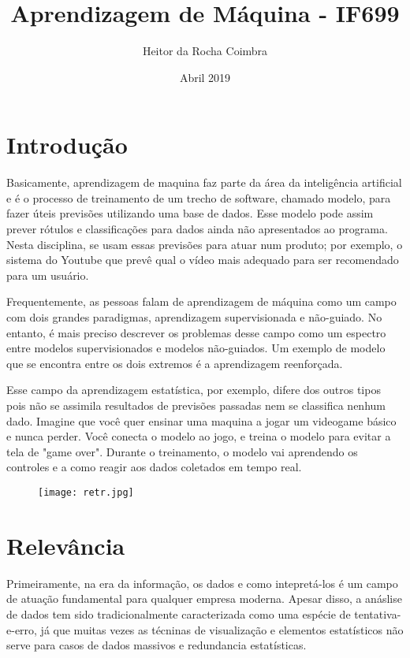 \documentclass[10pt]{article}
\title{Aprendizagem de Máquina - IF699}
\author{Heitor da Rocha Coimbra}
\date{Abril 2019}
\begin{document}
\maketitle

\section{Introdução}
Basicamente, aprendizagem de maquina faz parte da área da inteligência artificial e é o processo de treinamento de um trecho de software, chamado modelo, para fazer úteis previsões utilizando uma base de dados. Esse modelo pode assim prever rótulos e classificações para dados ainda não apresentados ao programa. Nesta disciplina, se usam essas previsões para atuar num produto; por exemplo, o sistema do Youtube que prevê qual o vídeo mais adequado para ser recomendado para um usuário.\newline


Frequentemente, as pessoas falam de aprendizagem de máquina como um campo com dois grandes paradigmas, aprendizagem supervisionada e não-guiado. No entanto, é mais preciso descrever os problemas desse campo como um espectro entre modelos supervisionados e modelos não-guiados. Um exemplo de modelo que se encontra entre os dois extremos é a aprendizagem reenforçada.\newline


Esse campo da aprendizagem estatística, por exemplo, difere dos outros tipos pois não se assimila resultados de previsões passadas nem se classifica nenhum dado. Imagine que você quer ensinar uma maquina a jogar um videogame básico e nunca perder. Você conecta o modelo ao jogo, e treina o modelo para evitar a tela de "game over". Durante o treinamento, o modelo vai aprendendo os controles e a como reagir aos dados coletados em tempo real.
\cite{alpaydin2015learning} 

\begin{figure}[ht]
\centering
\texttt{[image: retr.jpg]}
\caption{ \cite{photo2012learning}}
\label{fig:my_label}
\end{figure}

\section{Relevância}
Primeiramente, na era da informação, os dados e como intepretá-los é um campo de atuação fundamental para qualquer empresa moderna. Apesar disso, a anáslise de dados tem sido tradicionalmente caracterizada como uma espécie de tentativa-e-erro, já que muitas vezes as técninas de visualização e elementos estatísticos não serve para casos de dados massivos e redundancia estatísticas.\newline
\end{document}
